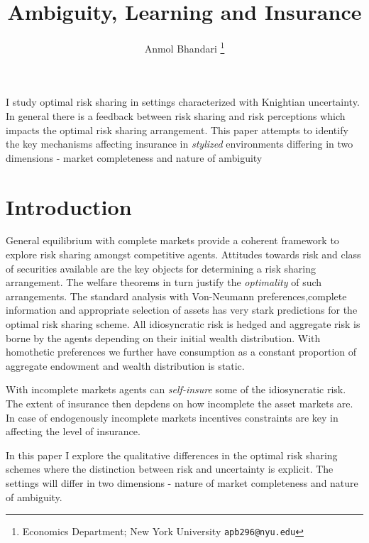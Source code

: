 \documentclass[12pt]{article}
\begin{document}
\title{Ambiguity, Learning and Insurance}
\author{Anmol Bhandari \thanks{Economics Department; New York University \texttt{apb296@nyu.edu}}}
\maketitle
I study  optimal risk sharing in settings characterized with Knightian uncertainty. In general there is a feedback between risk sharing and risk perceptions which impacts the optimal risk sharing arrangement. This paper attempts to identify the key mechanisms affecting insurance in \emph{stylized} environments differing in two dimensions - market completeness and nature of ambiguity
\newpage

\section{Introduction}
\noindent General equilibrium with complete markets provide a coherent framework to explore risk sharing amongst competitive agents. Attitudes towards risk and class of securities available are the key objects for determining a risk sharing arrangement. The welfare theorems in turn justify the \emph{optimality} of such arrangements. The standard analysis with Von-Neumann preferences,complete information and appropriate selection of assets has very stark predictions for the optimal risk sharing scheme. All idiosyncratic risk is hedged and aggregate risk is borne by the agents depending on their initial wealth distribution. With homothetic preferences we further have consumption as a constant proportion of aggregate endowment and wealth distribution is static. 

\vspace{3mm}
With incomplete markets agents can \emph{self-insure} some of the idiosyncratic risk. The extent of insurance then depdens on how incomplete the asset markets are. In case of endogenously incomplete markets incentives constraints are key in affecting the level of insurance.

\noindent In this paper I explore the qualitative differences in the optimal risk sharing schemes where the distinction between risk and uncertainty is explicit. The settings will differ in two dimensions  - nature of market completeness and nature of ambiguity. 

\end{document}
